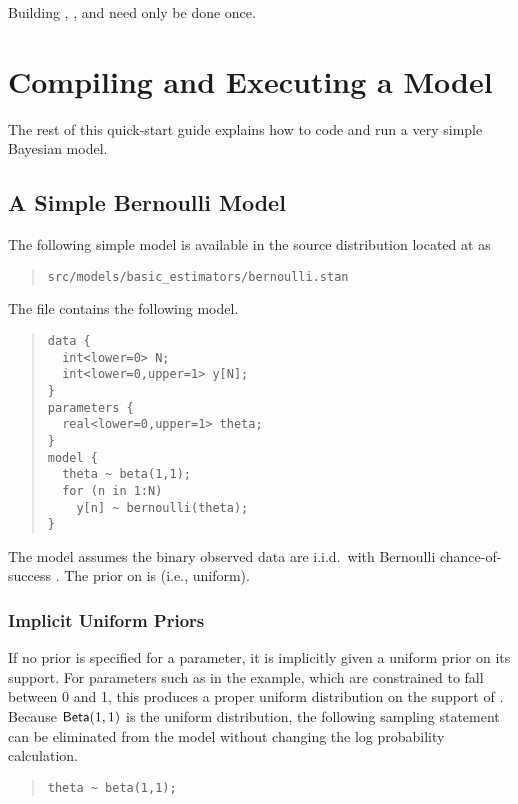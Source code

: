 Building , , and  need only be done once.

\section{Compiling and Executing a Model}

The rest of this quick-start guide explains how to code
and run a very simple Bayesian model.

\subsection{A Simple Bernoulli Model}

The following simple model is available in the source
distribution located at  as
%
\begin{quote}
\nolinkurl{src/models/basic_estimators/bernoulli.stan}
\end{quote}
%
The file contains the following model.
%
\begin{quote}
\begin{Verbatim}[fontsize=\small]
data { 
  int<lower=0> N; 
  int<lower=0,upper=1> y[N];
} 
parameters {
  real<lower=0,upper=1> theta;
} 
model {
  theta ~ beta(1,1);
  for (n in 1:N) 
    y[n] ~ bernoulli(theta);
}
\end{Verbatim}
\end{quote}
%
The model assumes the binary observed data 
are i.i.d.\ with Bernoulli chance-of-success .  The
prior on  is  (i.e., uniform).

\subsubsection{Implicit Uniform Priors}

If no prior is specified for a parameter, it is implicitly given a
uniform prior on its support.  For parameters such as  in
the example, which are constrained to fall between 0 and 1, this
produces a proper uniform distribution on the support of .
Because $\mbox{\sf Beta}(1,1)$ is the uniform distribution, the
following sampling statement can be eliminated from the model without
changing the log probability calculation.
%
\begin{quote}
\begin{Verbatim}[fontsize=\small]
  theta ~ beta(1,1);
\end{Verbatim}
\end{quote}

